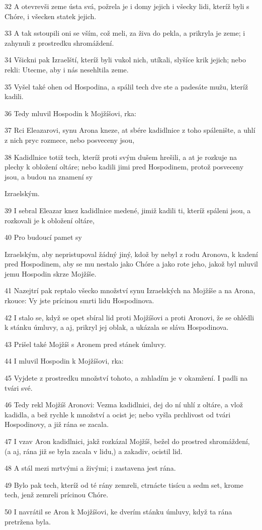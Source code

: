 \par 32 A otevrevši zeme ústa svá, požrela je i domy jejich i všecky lidi, kteríž byli s Chóre, i všecken statek jejich.
\par 33 A tak sstoupili oni se vším, což meli, za živa do pekla, a prikryla je zeme; i zahynuli z prostredku shromáždení.
\par 34 Všickni pak Izraelští, kteríž byli vukol nich, utíkali, slyšíce krik jejich; nebo rekli: Utecme, aby i nás nesehltila zeme.
\par 35 Vyšel také ohen od Hospodina, a spálil tech dve ste a padesáte mužu, kteríž kadili.
\par 36 Tedy mluvil Hospodin k Mojžíšovi, rka:
\par 37 Rci Eleazarovi, synu Arona kneze, at sbére kadidlnice z toho spálenište, a uhlí z nich pryc rozmece, nebo posveceny jsou,
\par 38 Kadidlnice totiž tech, kteríž proti svým dušem hrešili, a at je rozkuje na plechy k obložení oltáre; nebo kadili jimi pred Hospodinem, protož posveceny jsou, a budou na znamení sy\par Izraelským.
\par 39 I sebral Eleazar knez kadidlnice medené, jimiž kadili ti, kteríž spáleni jsou, a rozkovali je k obložení oltáre,
\par 40 Pro budoucí pamet sy\par Izraelským, aby nepristupoval žádný jiný, kdož by nebyl z rodu Aronova, k kadení pred Hospodinem, aby se mu nestalo jako Chóre a jako rote jeho, jakož byl mluvil jemu Hospodin skrze Mojžíše.
\par 41 Nazejtrí pak reptalo všecko množství synu Izraelských na Mojžíše a na Arona, rkouce: Vy jste prícinou smrti lidu Hospodinova.
\par 42 I stalo se, když se opet sbíral lid proti Mojžíšovi a proti Aronovi, že se ohlédli k stánku úmluvy, a aj, prikryl jej oblak, a ukázala se sláva Hospodinova.
\par 43 Prišel také Mojžíš s Aronem pred stánek úmluvy.
\par 44 I mluvil Hospodin k Mojžíšovi, rka:
\par 45 Vyjdete z prostredku množství tohoto, a zahladím je v okamžení. I padli na tvári své.
\par 46 Tedy rekl Mojžíš Aronovi: Vezma kadidlnici, dej do ní uhlí z oltáre, a vlož kadidla, a bež rychle k množství a ocist je; nebo vyšla prchlivost od tvári Hospodinovy, a již rána se zacala.
\par 47 I vzav Aron kadidlnici, jakž rozkázal Mojžíš, bežel do prostred shromáždení, (a aj, rána již se byla zacala v lidu,) a zakadiv, ocistil lid.
\par 48 A stál mezi mrtvými a živými; i zastavena jest rána.
\par 49 Bylo pak tech, kteríž od té rány zemreli, ctrnácte tisícu a sedm set, krome tech, jenž zemreli prícinou Chóre.
\par 50 I navrátil se Aron k Mojžíšovi, ke dverím stánku úmluvy, když ta rána pretržena byla.

